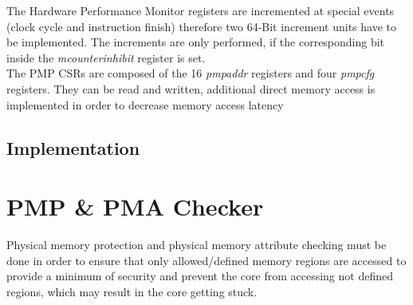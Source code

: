 The Hardware Performance Monitor registers are incremented at special events (clock cycle and instruction finish) therefore two 64-Bit increment units have to be implemented. The increments are only performed, if the corresponding bit inside the
\textit{mcounterinhibit} register is set.\\
The PMP CSRs are composed of the 16 \textit{pmpaddr} registers and four \textit{pmpcfg} registers. They can be read and written, additional direct memory access is implemented in order to decrease memory access latency
\subsection{Implementation}

\section{PMP \& PMA Checker}
Physical memory protection and physical memory attribute checking must be done in
order to ensure that only allowed/defined memory regions are accessed to provide a
minimum of security and prevent the core from accessing not defined regions, which
may result in the core getting stuck.\\


